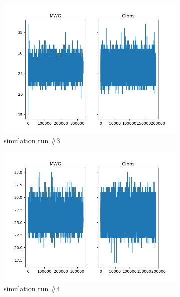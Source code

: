 \begin{figure}[H]
\begin{subfigure}{.3\textwidth}
    	\includegraphics[width=\linewidth]{../../plots/Trace_M2_N50_NMCMC1_seed2_diffind2.png}
    	\caption{simulation run \#3}
	\end{subfigure}
	\begin{subfigure}{.3\textwidth}
	    \centering
    	\includegraphics[width=\linewidth]{../../plots/Trace_M2_N50_NMCMC1_seed3_diffind2.png}
    	\caption{simulation run \#4}
	\end{subfigure}
	\begin{subfigure}{.3\textwidth}
	    \centering

\end{subfigure}
\end{figure}

